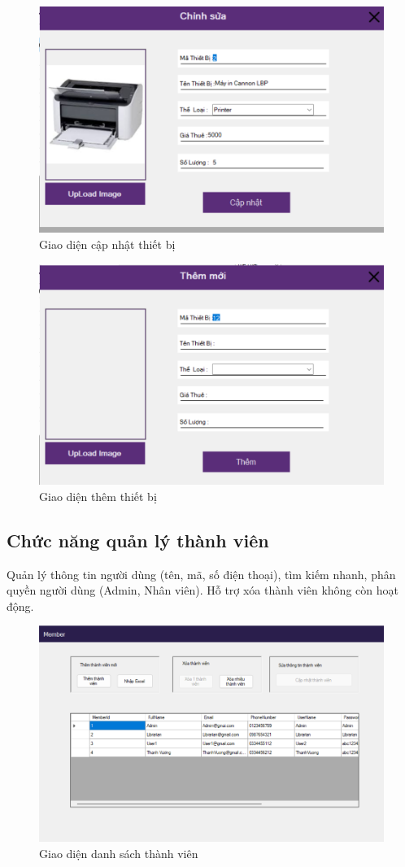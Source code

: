 \documentclass{article}
\begin{document}
\begin{figure} [H]
    \centering
    \includegraphics[width=0.8\linewidth]{images//Winform/cn ql tb2.png}
    \caption{Giao diện cập nhật thiết bị}
    \label{fig:enter-label}
\end{figure}

\begin{figure} [H]
    \centering
    \includegraphics[width=0.8\linewidth]{images//Winform/cn ql tb3.png}
    \caption{Giao diện thêm thiết bị}
    \label{fig:enter-label}
\end{figure}

\subsection{Chức năng quản lý thành viên}
Quản lý thông tin người dùng (tên, mã, số điện thoại), tìm kiếm nhanh, phân quyền người dùng (Admin, Nhân viên). Hỗ trợ xóa thành viên không còn hoạt động.

\begin{figure} [H]
    \centering
    \includegraphics[width=0.8\linewidth]{images//Winform/cn ql tv1.png}
    \caption{Giao diện danh sách thành viên}
    \label{fig:enter-label}
\end{figure}
\end{document}
